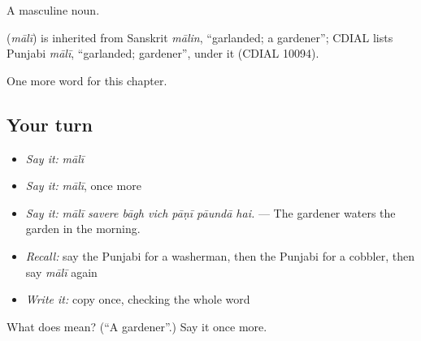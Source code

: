 A masculine noun.

\begin{cousinweb}
\textbf{} (\emph{mālī}) is inherited from Sanskrit \emph{mālin}, \textquotedblleft{}garlanded; a gardener\textquotedblright{}; CDIAL lists Punjabi \emph{mālī}, \textquotedblleft{}garlanded; gardener\textquotedblright{}, under it (CDIAL 10094).
\end{cousinweb}

\begin{grammarlens}[title={What you've built}]
One more word for this chapter.
\end{grammarlens}

\subsection*{Your turn}
\begin{itemize}
\raggedright
  \item \emph{Say it:} \emph{mālī}
  \item \emph{Say it:} \emph{mālī}, once more
  \item \emph{Say it:} \emph{mālī savere bāgh vich pāṇī pāundā hai.} — The gardener waters the garden in the morning.
  \item \emph{Recall:} say the Punjabi for a washerman, then the Punjabi for a cobbler, then say \emph{mālī} again
  \item \emph{Write it:} copy \textbf{} once, checking the whole word
\end{itemize}

\begin{tcolorbox}[breakable,colback=teal!4,colframe=teal!35!black,title={Before you move on}]
What does  mean? (\textquotedblleft{}A gardener\textquotedblright{}.) Say it once more.
\end{tcolorbox}
